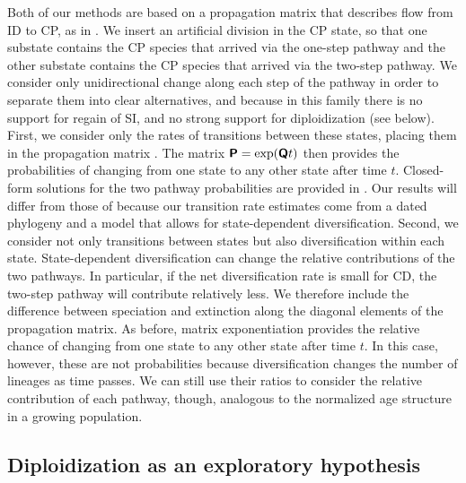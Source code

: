 Both of our methods are based on a propagation matrix that describes flow from ID to CP, as in \citet{robertson_2011}.
We insert an artificial division in the CP state, so that one substate contains the CP species that arrived via the one-step pathway and the other substate contains the CP species that arrived via the two-step pathway.
We consider only unidirectional change along each step of the pathway in order to separate them into clear alternatives, and because in this family there is no support for regain of SI, and no strong support for diploidization (see below).
First, we consider only the rates of transitions between these states, placing them in the propagation matrix .
The matrix $\bm{\mathsf{P}} = \exp(\bm{\mathsf{Q}} t)$ then provides the probabilities of changing from one state to any other state after time $t$.
Closed-form solutions for the two pathway probabilities are provided in \citet{robertson_2011}.
Our results will differ from those of \citet{robertson_2011} because our transition rate estimates come from a dated phylogeny and a model that allows for state-dependent diversification.
%
Second, we consider not only transitions between states but also diversification within each state.
State-dependent diversification can change the relative contributions of the two pathways.
In particular, if the net diversification rate is small for CD, the two-step pathway will contribute relatively less.
We therefore include the difference between speciation and extinction along the diagonal elements of the propagation matrix.
As before, matrix exponentiation provides the relative chance of changing from one state to any other state after time $t$.
In this case, however, these are not probabilities because diversification changes the number of lineages as time passes.
We can still use their ratios to consider the relative contribution of each pathway, though, analogous to the normalized age structure in a growing population. %


\subsection{Diploidization as an exploratory hypothesis}

